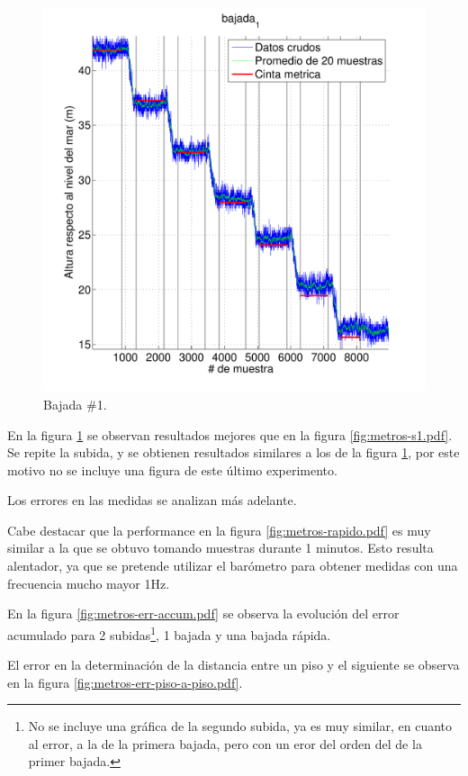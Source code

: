 \documentclass[spanish,12pt,a4paper,titlepage]{report}
\begin{document}
\newpage
\vspace{-40pt}
\begin{figure}[h!]
\centering
  \includegraphics[width=.85\textwidth]{./pics/metros-b1.pdf}
\vspace{-25pt}
  \caption{Bajada \#1.}
  \label{fig:metros-b1.pdf}
\end{figure}

En la figura \ref{fig:metros-b1.pdf} se observan resultados mejores que en la figura \ref{fig:metros-s1.pdf}. Se repite la subida, y se obtienen resultados similares a los de la figura \ref{fig:metros-b1.pdf}, por este motivo no se incluye una figura de este último experimento.

Los errores en las medidas se analizan más adelante.

Cabe destacar que la performance en la figura \ref{fig:metros-rapido.pdf} es muy similar a la que se obtuvo tomando muestras durante 1 minutos. Esto resulta alentador, ya que se pretende utilizar el barómetro para obtener medidas con una frecuencia mucho mayor 1Hz.

En la figura \ref{fig:metros-err-accum.pdf} se observa la evolución del error acumulado para 2 subidas\footnote{No se incluye una gráfica de la segundo subida, ya es muy similar, en cuanto al error, a la de la primera bajada, pero con un eror del orden del de la primer bajada.}, 1 bajada y una bajada rápida.

El error en la determinación de la distancia entre un piso y el siguiente se observa en la figura \ref{fig:metros-err-piso-a-piso.pdf}.
\end{document}
